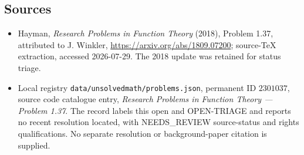 \documentclass[11pt]{article}
\begin{document}
\subsection{Sources}
\begin{itemize}
\item Hayman, \emph{Research Problems in Function Theory} (2018), Problem 1.37, attributed to J. Winkler, \url{https://arxiv.org/abs/1809.07200}; source-TeX extraction, accessed 2026-07-29. The 2018 update was retained for status triage.
\item Local registry \texttt{data/unsolvedmath/problems.json}, permanent ID $2301037$, source code catalogue entry, \emph{Research Problems in Function Theory --- Problem 1.37}. The record labels this open and OPEN-TRIAGE and reports no recent resolution located, with NEEDS\_REVIEW source-status and rights qualifications. No separate resolution or background-paper citation is supplied.
\end{itemize}
\end{document}
